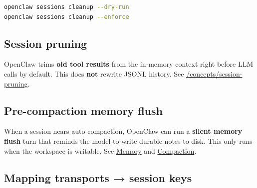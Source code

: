 \begin{lstlisting}[language=bash]
openclaw sessions cleanup --dry-run
openclaw sessions cleanup --enforce
\end{lstlisting}


\subsection{Session pruning}


OpenClaw trims \textbf{old tool results} from the in-memory context right before LLM calls by default.
This does \textbf{not} rewrite JSONL history. See \href{/concepts/session-pruning}{/concepts/session-pruning}.

\subsection{Pre-compaction memory flush}


When a session nears auto-compaction, OpenClaw can run a \textbf{silent memory flush}
turn that reminds the model to write durable notes to disk. This only runs when
the workspace is writable. See \href{/concepts/memory}{Memory} and
\href{/concepts/compaction}{Compaction}.

\subsection{Mapping transports → session keys}


